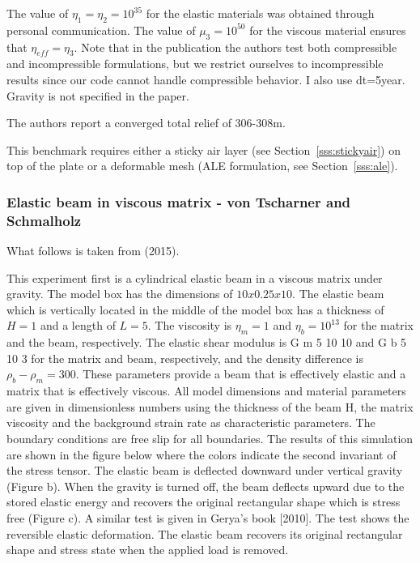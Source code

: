 The value of $\eta_1=\eta_2=10^{35}$ for the elastic materials was obtained through personal communication. 
The value of $\mu_3=10^{50}$ for the viscous material ensures that $\eta_{eff}=\eta_3$.
Note that in the publication the authors test both compressible and incompressible 
formulations, but we restrict ourselves to incompressible results since our code cannot handle compressible behavior. 
I also use dt=5year.
Gravity is not specified in the paper.

The authors report a converged total relief of 306-308m.

This benchmark requires either a sticky air layer (see Section~\ref{sss:stickyair})
on top of the plate or a deformable mesh (ALE formulation, see Section~\ref{sss:ale}).



\subsubsection{Elastic beam in viscous matrix - von Tscharner and Schmalholz}


What follows is taken from \textcite{vosc15} (2015).

This experiment first is a cylindrical elastic beam in a viscous matrix under gravity. 
The model box has the dimensions of $10x0.25x10$. The elastic beam which is vertically 
located in the middle of the model box has a thickness of $H=1$ and a length of $L=5$. 
The viscosity is $\eta_m=1$ and $\eta_b=10^{13}$ for the matrix and the beam, respectively. 
The elastic shear modulus is G m 5 10 10 and G b 5 10 3 for the matrix and beam, 
respectively, and the density difference is $\rho_b-\rho_m=300$. These
parameters provide a beam that is effectively elastic and a matrix that 
is effectively viscous. All model dimensions and material parameters are given in 
dimensionless numbers using the thickness of the beam H, the matrix viscosity and 
the background strain rate as characteristic parameters. The
boundary conditions are free slip for all boundaries. The results of this 
simulation are shown in the figure below where the colors indicate the second 
invariant of the stress tensor. The elastic beam is
deflected downward under vertical gravity (Figure b). When the gravity is turned off, the beam
deflects upward due to the stored elastic energy and recovers the original rectangular 
shape which is stress free (Figure c). A similar test is given in Gerya's book [2010]. 
The test shows the reversible elastic deformation. The elastic beam recovers its original rectangular shape and stress state when the applied load is removed.

